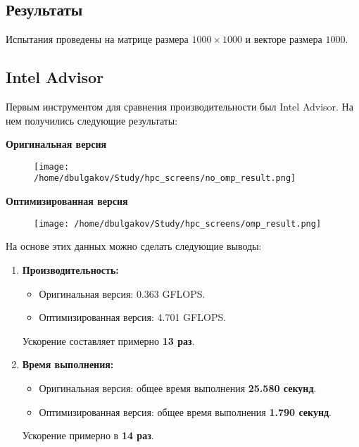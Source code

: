 \documentclass[12pt]{extarticle}
\begin{document}
\begin{spacing}{1.5}
    \newpage
    \section{Результаты}

    Испытания проведены на матрице размера \(1000 \times 1000\) и векторе размера \(1000\).

    \subsection{Intel Advisor}

    \par
    Первым инструментом для сравнения производительности был Intel Advisor. На нем получились следующие результаты:

    \par \textbf{Оригинальная версия}

    \begin{figure}[ht]
        \centering
        \texttt{[image: /home/dbulgakov/Study/hpc\_screens/no\_omp\_result.png]}
    \end{figure}

    \par \textbf{Оптимизированная версия}

    \begin{figure}[ht]
        \centering
        \texttt{[image: /home/dbulgakov/Study/hpc\_screens/omp\_result.png]}
    \end{figure}

    На основе этих данных можно сделать следующие выводы:

    \begin{enumerate}
        \item \textbf{Производительность:}
        \begin{itemize}
            \item Оригинальная версия: 0.363 GFLOPS.
            \item Оптимизированная версия: 4.701 GFLOPS.
        \end{itemize}
        Ускорение составляет примерно \textbf{13 раз}.
    
        \item \textbf{Время выполнения:}
        \begin{itemize}
            \item Оригинальная версия: общее время выполнения \textbf{25.580 секунд}.
            \item Оптимизированная версия: общее время выполнения \textbf{1.790 секунд}.
        \end{itemize}
        Ускорение примерно в \textbf{14 раз}.
    

\end{enumerate}
\end{spacing}
\end{document}
